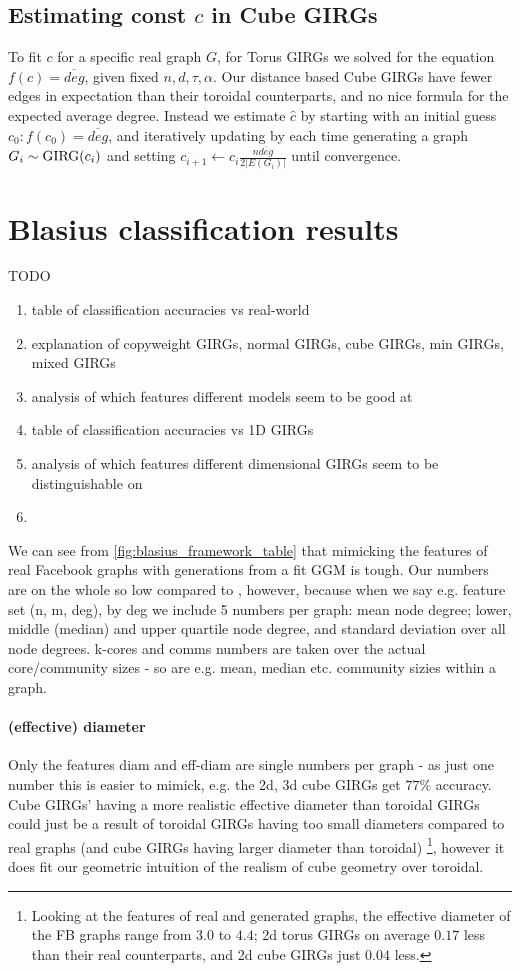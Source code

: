 \subsection{Estimating const $c$ in Cube GIRGs}
To fit $c$ for a specific real graph $G$, for Torus GIRGs we solved for the equation $f(c) = \overline{deg}$, given fixed $n, d, \tau, \alpha$. Our distance based Cube GIRGs have fewer edges in expectation than their toroidal counterparts, and no nice formula for the expected average degree. Instead we estimate $\hat{c}$ by starting with an initial guess $c_0: f(c_0) = \overline{deg}$, and iteratively updating by each time generating a graph $G_i \sim \operatorname{GIRG}(c_i)$ and setting $c_{i+1} \gets c_i \frac{n \overline{deg}}{2 |E(G_i)|}$ until convergence.

\section{Blasius classification results}
TODO
\begin{enumerate}
    \item table of classification accuracies vs real-world
    \item explanation of copyweight GIRGs, normal GIRGs, cube GIRGs, min GIRGs, mixed GIRGs
    \item analysis of which features different models seem to be good at
    \item table of classification accuracies vs 1D GIRGs
    \item analysis of which features different dimensional GIRGs seem to be distinguishable on
    \item 
\end{enumerate}


We can see from \cref{fig:blasius_framework_table} that mimicking the features of real Facebook graphs with generations from a fit GGM is tough. Our numbers are on the whole so low compared to \cite{blasius2018towards}, however, because when we say e.g. feature set (n, m, deg), by deg we include 5 numbers per graph: mean node degree; lower, middle (median) and upper quartile node degree, and standard deviation over all node degrees. k-cores and comms numbers are taken over the actual core/community sizes - so are e.g. mean, median etc. community sizies within a graph.

\paragraph{(effective) diameter}
Only the features diam and eff-diam  are single numbers per graph - as just one number this is easier to mimick, e.g. the 2d, 3d cube GIRGs get $77\%$ accuracy. Cube GIRGs' having a more realistic effective diameter than toroidal GIRGs could just be a result of toroidal GIRGs having too small diameters compared to real graphs (and cube GIRGs having larger diameter than toroidal) \footnote{Looking at the features of real and generated graphs, the effective diameter of the FB graphs range from $3.0$ to $4.4$; 2d torus GIRGs on average $0.17$ less than their real counterparts, and 2d cube GIRGs just $0.04$ less.}, however it does fit our geometric intuition of the realism of cube geometry over toroidal.

